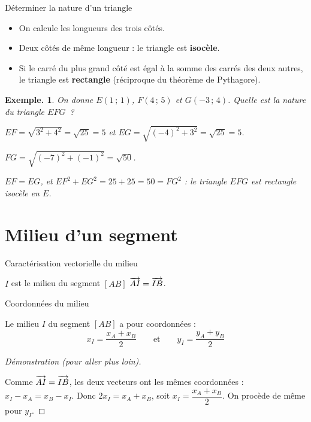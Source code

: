 \documentclass[12pt]{article}
\theoremstyle{break}
\newtheorem*{example}{Exemple.}
\newenvironment{demo}[1][\proofname]{%
  \begin{proof}[#1]$ $\newline
  }{%
  \end{proof}
}
\begin{document}
\begin{method}{Déterminer la nature d'un triangle}{}
  \begin{itemize}
    \item On calcule les longueurs des trois côtés.
    \item Deux côtés de même longueur : le triangle est \textbf{isocèle}.
    \item Si le carré du plus grand côté est égal à la somme des carrés des deux autres, le triangle est \textbf{rectangle} (réciproque du théorème de Pythagore).
  \end{itemize}
\end{method}

\begin{example}
  On donne $E(1\,;\,1)$, $F(4\,;\,5)$ et $G(-3\,;\,4)$. Quelle est la nature du triangle $EFG$~?
  \begin{reponse}
    $EF = \sqrt{3^2 + 4^2} = \sqrt{25} = 5$ \quad et \quad $EG = \sqrt{(-4)^2 + 3^2} = \sqrt{25} = 5$.

    $FG = \sqrt{(-7)^2 + (-1)^2} = \sqrt{50}$.

    $EF = EG$, et $EF^2 + EG^2 = 25 + 25 = 50 = FG^2$ : le triangle $EFG$ est rectangle isocèle en $E$.
  \end{reponse}
\end{example}

\newpage
\section{Milieu d'un segment}

\begin{proposition}{Caractérisation vectorielle du milieu}{}
  \begin{multihide}
    $I$ est le milieu du segment $[AB]$ \ssi $\overrightarrow{AI} = \overrightarrow{IB}$.
  \end{multihide}
\end{proposition}

\begin{proposition}{Coordonnées du milieu}{}
  \begin{multihide}
    Le milieu $I$ du segment $[AB]$ a pour coordonnées :
    \[
      x_I = \frac{x_A + x_B}{2} \qquad \text{et} \qquad y_I = \frac{y_A + y_B}{2}
    \]
  \end{multihide}
\end{proposition}

\begin{demo}[Démonstration (pour aller plus loin)]
  Comme $\overrightarrow{AI} = \overrightarrow{IB}$, les deux vecteurs ont les mêmes coordonnées : $x_I - x_A = x_B - x_I$.
  Donc $2x_I = x_A + x_B$, soit $x_I = \dfrac{x_A + x_B}{2}$. On procède de même pour $y_I$.
\end{demo}
\end{document}
